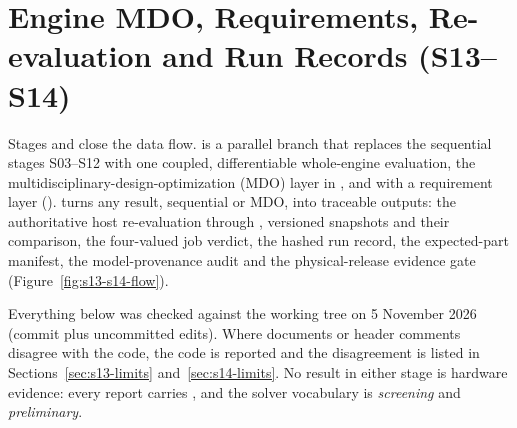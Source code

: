 \chapter{Engine MDO, Requirements, Re-evaluation and Run Records (S13--S14)}\label{ch:s13-s14}

Stages  and  close the data flow.  is a parallel branch that replaces the sequential stages S03--S12 with one coupled, differentiable whole-engine evaluation, the multidisciplinary-design-optimization (MDO) layer in , and with a requirement layer ().  turns any result, sequential or MDO, into traceable outputs: the authoritative host re-evaluation through , versioned snapshots and their comparison, the four-valued job verdict, the hashed run record, the expected-part manifest, the model-provenance audit and the physical-release evidence gate (Figure~\ref{fig:s13-s14-flow}).

Everything below was checked against the working tree on 5 November 2026 (commit  plus uncommitted edits). Where documents or header comments disagree with the code, the code is reported and the disagreement is listed in Sections~\ref{sec:s13-limits} and~\ref{sec:s14-limits}. No result in either stage is hardware evidence: every report carries , and the solver vocabulary is \emph{screening} and \emph{preliminary}.

